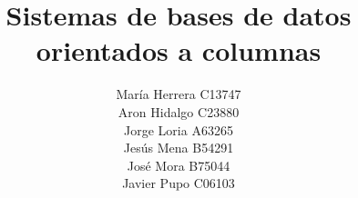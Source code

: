 \documentclass[stu,12pt,spanish]{apa7}
\title{Sistemas de bases de datos orientados a columnas}
\author{María Herrera C13747 \\ Aron Hidalgo C23880 \\ Jorge Loria A63265 \\ Jesús Mena B54291 \\ José Mora B75044 \\ Javier Pupo C06103}
\begin{document}
\maketitle

\renewcommand{\contentsname}{Tabla de contenidos}
\tableofcontents
\newpage



%





\newpage
\nocite{*}
\printbibliography[heading=bibintoc]
\end{document}
